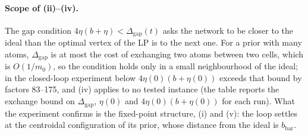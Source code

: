 \paragraph{Scope of (ii)--(iv).} The gap condition $4\eta(b+\eta) < \Delta_{\mathrm{gap}}(t)$ asks the network to be
closer to the ideal than the optimal vertex of the LP is to the next one. For a prior with many atoms,
$\Delta_{\mathrm{gap}}$ is at most the cost of exchanging two atoms between two cells, which is $O(1/m_0)$, so the
condition holds only in a small neighbourhood of the ideal; in the closed-loop experiment below $4\eta(0)(b+\eta(0))$
exceeds that bound by factors 83--175, and (iv) applies to no tested instance (the table reports the exchange bound on
$\Delta_{\mathrm{gap}}$, $\eta(0)$ and $4\eta(0)(b+\eta(0))$ for each run). What the experiment confirms is the
fixed-point structure, (i) and (v): the loop settles at the centroidal configuration of its prior, whose distance from
the ideal is $b_{\mathrm{bar}}$.

